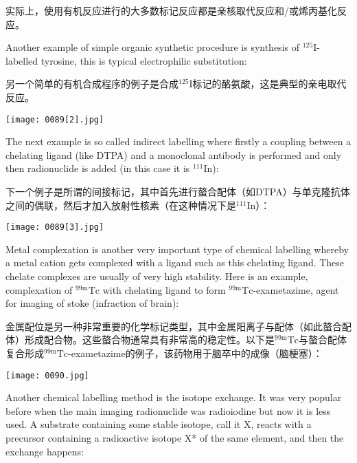 \documentclass[dvipsnames, svgnames,a4paper,11pt]{article}
\begin{document}
实际上，使用有机反应进行的大多数标记反应都是亲核取代反应和/或烯丙基化反应。

Another example of simple organic synthetic procedure is synthesis of ${}^{125}\mathrm{I}$-labelled
tyrosine, this is typical electrophilic substitution:

另一个简单的有机合成程序的例子是合成${}^{125}\mathrm{I}$标记的酪氨酸，这是典型的亲电取代反应。

\begin{figure*}[h]
    \centering
    \texttt{[image: 0089[2].jpg]}
\end{figure*}


The next example is so called indirect labelling where firstly a coupling between a
chelating ligand (like DTPA) and a monoclonal antibody is performed and only then
radionuclide is added (in this case it is ${}^{111}\mathrm{In}$):

下一个例子是所谓的间接标记，其中首先进行螯合配体（如DTPA）与单克隆抗体之间的偶联，然后才加入放射性核素（在这种情况下是${}^{111}\mathrm{In}$）：

\begin{figure*}[h]
    \centering
    \texttt{[image: 0089[3].jpg]}
\end{figure*}


Metal complexation is another very important type of chemical labelling whereby a
metal cation gets complexed with a ligand such as this chelating ligand. These
chelate complexes are usually of very high stability. Here is an example,
complexation of ${}^\mathrm{99m}\mathrm{Tc}$ with chelating ligand to form ${}^\mathrm{99m}\mathrm{Tc}$-exametazime, agent for
imaging of stoke (infraction of brain):

金属配位是另一种非常重要的化学标记类型，其中金属阳离子与配体（如此螯合配体）形成配合物。这些螯合物通常具有非常高的稳定性。以下是${}^\mathrm{99m}\mathrm{Tc}$与螯合配体复合形成${}^\mathrm{99m}\mathrm{Tc}$-exametazime的例子，该药物用于脑卒中的成像（脑梗塞）：

\begin{figure*}[h]
    \centering
    \texttt{[image: 0090.jpg]}
\end{figure*}


Another chemical labelling method is the isotope exchange. It was very popular
before when the main imaging radionuclide was radioiodine but now it is less used. A
substrate containing some stable isotope, call it X, reacts with a precursor containing
a radioactive isotope X* of the same element, and then the exchange happens:
\end{document}
